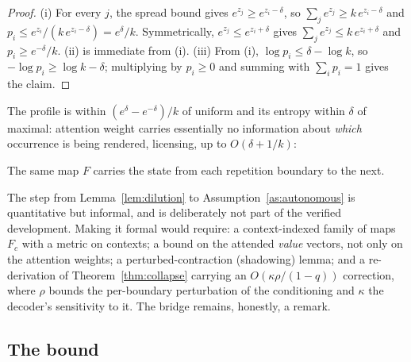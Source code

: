 \begin{proof}
(i) For every $j$, the spread bound gives
$e^{z_j} \ge e^{z_i - \delta}$, so
$\sum_j e^{z_j} \ge k\, e^{z_i - \delta}$ and
$p_i \le e^{z_i} / (k\, e^{z_i - \delta}) = e^{\delta}/k$. Symmetrically,
$e^{z_j} \le e^{z_i + \delta}$ gives
$\sum_j e^{z_j} \le k\, e^{z_i + \delta}$ and
$p_i \ge e^{-\delta}/k$.
(ii) is immediate from (i).
(iii) From (i), $\log p_i \le \delta - \log k$, so
$-\log p_i \ge \log k - \delta$; multiplying by $p_i \ge 0$ and summing
with $\sum_i p_i = 1$ gives the claim.
\end{proof}

The profile is within $(e^{\delta}-e^{-\delta})/k$ of uniform and its
entropy within $\delta$ of maximal: attention weight carries essentially
no information about \emph{which} occurrence is being rendered, licensing,
up to $O(\delta + 1/k)$:

\begin{assumption}
\label{as:autonomous}
The same map $F$ carries the state from each repetition boundary to the
next.
\end{assumption}

\begin{remark}
\label{rem:bridge}
The step from Lemma~\ref{lem:dilution} to
Assumption~\ref{as:autonomous} is quantitative but informal, and is
deliberately not part of the verified development. Making it formal would
require: a context-indexed family of maps $F_c$ with a metric on
contexts; a bound on the attended \emph{value} vectors, not only on the
attention weights; a perturbed-contraction (shadowing) lemma; and a
re-derivation of Theorem~\ref{thm:collapse} carrying an
$O(\kappa\rho/(1-q))$ correction, where $\rho$ bounds the per-boundary
perturbation of the conditioning and $\kappa$ the decoder's sensitivity
to it. The bridge remains, honestly, a remark.
\end{remark}

\subsection{The bound}

